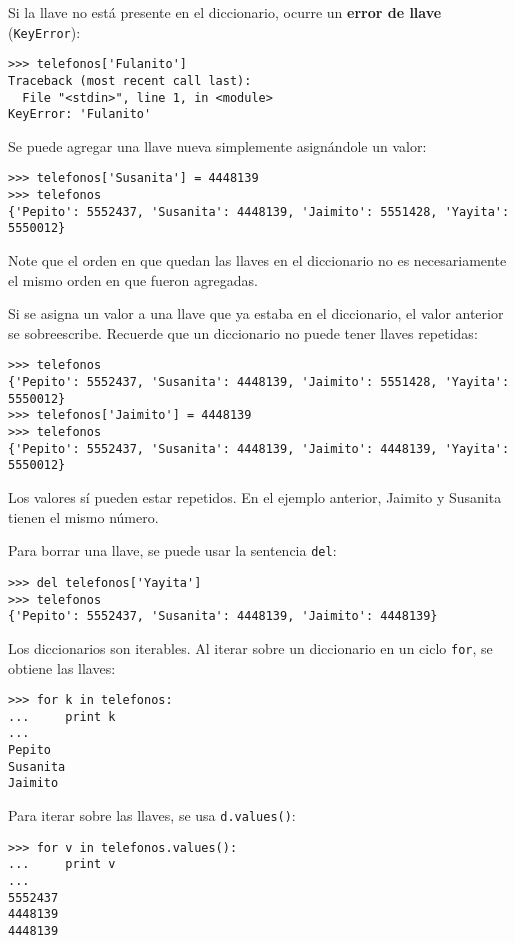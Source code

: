 Si la llave no está presente en el diccionario, ocurre un \textbf{error
de llave} (\lstinline!KeyError!):

\begin{lstlisting}
>>> telefonos['Fulanito']
Traceback (most recent call last):
  File "<stdin>", line 1, in <module>
KeyError: 'Fulanito'
\end{lstlisting}

Se puede agregar una llave nueva simplemente asignándole un valor:

\begin{lstlisting}
>>> telefonos['Susanita'] = 4448139
>>> telefonos
{'Pepito': 5552437, 'Susanita': 4448139, 'Jaimito': 5551428, 'Yayita': 5550012}
\end{lstlisting}

Note que el orden en que quedan las llaves en el diccionario no es
necesariamente el mismo orden en que fueron agregadas.

Si se asigna un valor a una llave que ya estaba en el diccionario, el
valor anterior se sobreescribe. Recuerde que un diccionario no puede
tener llaves repetidas:

\begin{lstlisting}
>>> telefonos
{'Pepito': 5552437, 'Susanita': 4448139, 'Jaimito': 5551428, 'Yayita': 5550012}
>>> telefonos['Jaimito'] = 4448139
>>> telefonos
{'Pepito': 5552437, 'Susanita': 4448139, 'Jaimito': 4448139, 'Yayita': 5550012}
\end{lstlisting}

Los valores sí pueden estar repetidos. En el ejemplo anterior, Jaimito y
Susanita tienen el mismo número.

Para borrar una llave, se puede usar la sentencia \lstinline!del!:

\begin{lstlisting}
>>> del telefonos['Yayita']
>>> telefonos
{'Pepito': 5552437, 'Susanita': 4448139, 'Jaimito': 4448139}
\end{lstlisting}

Los diccionarios son iterables. Al iterar sobre un diccionario en un
ciclo \lstinline!for!, se obtiene las llaves:

\begin{lstlisting}
>>> for k in telefonos:
...     print k
...
Pepito
Susanita
Jaimito
\end{lstlisting}

Para iterar sobre las llaves, se usa \lstinline!d.values()!:

\begin{lstlisting}
>>> for v in telefonos.values():
...     print v
...
5552437
4448139
4448139
\end{lstlisting}

